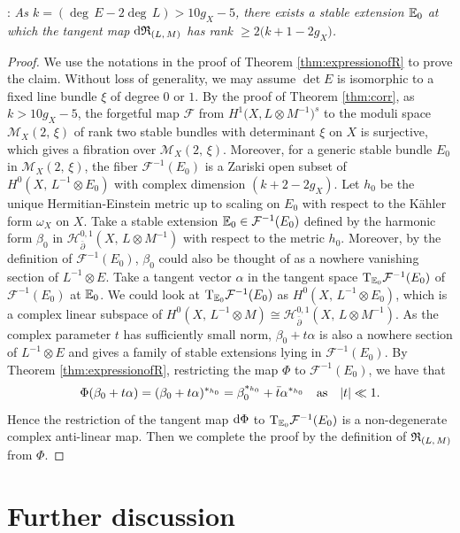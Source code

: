 \documentclass[12pt]{article}
\begin{document}
: {\it As $k=(\deg\, E-2\deg\, L) > 10g_{X} - 5$, there exists a stable extension ${\Bbb E}_0$ at which the tangent map ${\rm d}{\frak R}_{(L,\,M)}$ has rank $\geq 2\big(k+1-2g_X\big)$.}
\begin{proof} We use the notations in the proof of Theorem \ref{thm:expressionofR} to prove the claim. Without loss of generality, we may assume $\det E$ is isomorphic to a fixed line bundle $\xi$ of degree $0$ or $1$. By the proof of Theorem \ref{thm:corr}, as $k > 10g_{X} - 5$, the forgetful map ${\mathcal F}$ from $H^{1}\big(X, L \otimes M^{-1}\big)^{s}$ to the moduli space ${\mathcal M}_X(2,\,\xi)$ of rank two stable bundles with determinant $\xi$ on $X$ is surjective, which gives a fibration over ${\mathcal M}_X(2,\,\xi)$. Moreover, for a generic stable bundle $E_0$ in ${\mathcal M}_X(2,\,\xi)$, the fiber ${\mathcal F}^{-1}(E_0)$ is a Zariski open subset of $H^0(X,\,L^{-1}\otimes E_0)$ with complex dimension $(k+2-2g_X)$.
Let $h_0$ be the unique Hermitian-Einstein metric up to scaling on $E_0$ with respect to the K\"ahler form $\omega_X$ on $X$. Take a stable extension ${\Bbb E}_0\in {\mathcal F}^{-1}(E_0)$  defined by the harmonic form $\beta_0$ in ${\mathcal H}_{\bar \partial}^{0,1}(X,\,L\otimes M^{-1})$ with respect to the metric $h_0$. Moreover, by the definition of ${\mathcal F}^{-1}(E_0)$, $\beta_0$ could also be thought of as a nowhere vanishing section of $L^{-1}\otimes E$. Take a tangent vector $\alpha$ in the tangent space ${\rm T}_{{\Bbb E}_0}{\mathcal F}^{-1}(E_0)$  of ${\mathcal F}^{-1}(E_0)$ at ${\Bbb E}_0$. We could look at ${\rm T}_{{\Bbb E}_0}{\mathcal F}^{-1}(E_0)$ as $H^0(X,\,L^{-1}\otimes E_0)$, which is a complex linear subspace of $H^0(X,\,L^{-1}\otimes M)\cong {\mathcal H}_{\bar \partial}^{0,1}(X,\,L\otimes M^{-1})$.  As the complex parameter $t$ has sufficiently small norm, $\beta_0+t\alpha$ is also a nowhere section of $L^{-1}\otimes E$ and gives a family of stable extensions lying in ${\mathcal F}^{-1}(E_0)$. By Theorem \ref{thm:expressionofR}, restricting the map $\Phi$ to ${\mathcal F}^{-1}(E_0)$, we have that $$\Phi(\beta_0+t\alpha)=(\beta_0+t\alpha)^{*_{h_0}}=\beta_0^{*_{h_0}}+\bar t \alpha^{*_{h_0}}\quad {\rm as}\quad |t| \ll 1.$$ Hence the restriction of the tangent map ${\rm d}\Phi$ to ${\rm T}_{{\Bbb E}_0}{\mathcal F}^{-1}(E_0)$ is a non-degenerate complex anti-linear map. Then we complete the proof by the definition of ${\frak R}_{(L,\,M)}$ from $\Phi$.
\end{proof}

\section{Further discussion}
\end{document}
